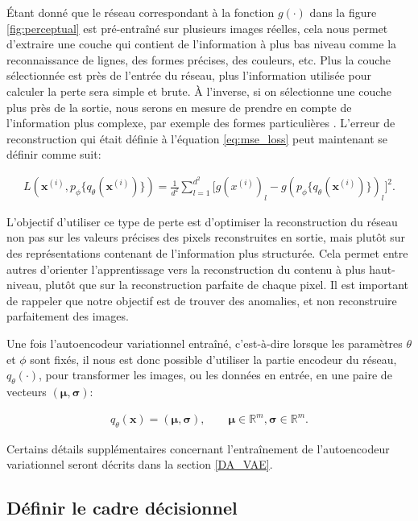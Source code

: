 Étant donné que le réseau correspondant à la fonction $g(\cdot)$ dans la figure \ref{fig:perceptual} est pré-entraîné sur plusieurs images réelles, cela nous permet d'extraire une couche qui contient de l'information à plus bas niveau comme la reconnaissance de lignes, des formes précises, des couleurs, etc. Plus la couche sélectionnée est près de l'entrée du réseau, plus l'information utilisée pour calculer la perte sera simple et brute. À l'inverse, si on sélectionne une couche plus près de la sortie, nous serons en mesure de prendre en compte de l'information plus complexe, par exemple des formes particulières \citep{Johnson2016Perceptual}. L'erreur de reconstruction qui était définie à l'équation \ref{eq:mse_loss} peut maintenant se définir comme suit:

\begin{gather} \label{eq:perceptual_loss}
L(\boldsymbol{x}^{(i)}, p_\phi\{q_\theta(\boldsymbol{x}^{(i)})\}) = \frac{1}{d^2} \sum_{l=1}^{d^2} \Big[g(x^{(i)})_{l} - g(p_\phi\{q_\theta(\boldsymbol{x}^{(i)})\})_{l}\Big]^2.
\end{gather}

L'objectif d'utiliser ce type de perte est d'optimiser la reconstruction du réseau non pas sur les valeurs précises des pixels reconstruites en sortie, mais plutôt sur des représentations contenant de l'information plus structurée. Cela permet entre autres d'orienter l'apprentissage vers la reconstruction du contenu à plus haut-niveau, plutôt que sur la reconstruction parfaite de chaque pixel. Il est important de rappeler que notre objectif est de trouver des anomalies, et non reconstruire parfaitement des images.

Une fois l'autoencodeur variationnel entraîné, c'est-à-dire lorsque les paramètres $\theta$ et $\phi$ sont fixés, il nous est donc possible d'utiliser la partie encodeur du réseau, $q_{\theta}(\cdot) $, pour transformer les images, ou les données en entrée, en une paire de vecteurs $(\boldsymbol{\mu}, \boldsymbol{\sigma})$:

\begin{gather*}  \label{eq:encodeur}
q_{\theta}(\boldsymbol{x}) = (\boldsymbol{\mu}, \boldsymbol{\sigma}), \qquad \boldsymbol{\mu} \in \mathbb{R}^m, \boldsymbol{\sigma} \in \mathbb{R}^m.
\end{gather*}

Certains détails supplémentaires concernant l'entraînement de l'autoencodeur variationnel seront décrits dans la section \ref{DA_VAE}.


\subsection{Définir le cadre décisionnel} \label{cadre_decisionnel}

